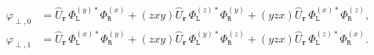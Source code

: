 \begin{align}
\varphi_{\perp,0}
    &=
        \hat{U}_{\bm{r}}\,
        \Phi_{\mathtt{L}}^{\left(y\right)*}
        \Phi_{\mathtt{R}}^{\left(x\right)}
            +
        \left(zxy\right)
        \hat{U}_{\bm{r}}\,
        \Phi_{\mathtt{L}}^{\left(z\right)*}
        \Phi_{\mathtt{R}}^{\left(y\right)}
            +
        \left(yzx\right)
        \hat{U}_{\bm{r}}\,
        \Phi_{\mathtt{L}}^{\left(x\right)*}
        \Phi_{\mathtt{R}}^{\left(z\right)}
,\\
\varphi_{\perp,1}
    &=
        \hat{U}_{\bm{r}}\,
        \Phi_{\mathtt{L}}^{\left(x\right)*}
        \Phi_{\mathtt{R}}^{\left(y\right)}
            +
        \left(zxy\right)
        \hat{U}_{\bm{r}}\,
        \Phi_{\mathtt{L}}^{\left(y\right)*}
        \Phi_{\mathtt{R}}^{\left(z\right)}
            +
        \left(yzx\right)
        \hat{U}_{\bm{r}}\,
        \Phi_{\mathtt{L}}^{\left(z\right)*}
        \Phi_{\mathtt{R}}^{\left(x\right)}
.
\end{align}